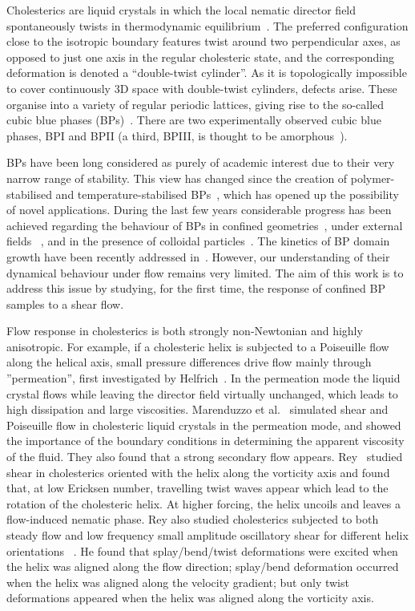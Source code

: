 \documentclass[aps,pre,reprint,superscriptaddress, twocolumn]{revtex4}
\begin{document}
Cholesterics are liquid crystals in which the local nematic director field spontaneously 
twists in thermodynamic equilibrium~\cite{deGennes}. The preferred configuration close 
to the isotropic boundary features twist around two perpendicular axes, as opposed to 
just one axis in the regular cholesteric state, and the corresponding deformation is 
denoted a ``double-twist cylinder''.
As it is topologically impossible to cover continuously 3D space with double-twist 
cylinders, defects arise. These organise into a variety of regular periodic lattices, 
giving rise to the so-called cubic blue phases (BPs)~\cite{Grebel:1984,Wright:1989}. 
There are two experimentally observed cubic blue phases, BPI and BPII (a third, BPIII, 
is thought to be amorphous~\cite{Henrich:2011a}).

BPs have been long considered as purely of academic interest due to their very narrow 
range of stability. This view has changed since the creation of polymer-stabilised and 
temperature-stabilised BPs~\cite{Kikuchi:2002,Coles:2005}, which has opened up the 
possibility of novel applications.
During the last few years considerable progress has been achieved regarding the behaviour 
of BPs in confined geometries~\cite{Fukuda:2010a, Fukuda:2010b, Ravnik:2011b}, under 
external fields ~\cite{Alexander:2008,Fukuda:2009,Henrich:2010a,Castles:2010,Tiribocchi:2011a}, 
and in the presence of colloidal particles~\cite{Ravnik:2011a}.
The kinetics of BP domain growth have been recently addressed in~\cite{Henrich:2010b}. 
However, our understanding of their dynamical behaviour under flow remains
very limited. The aim of this work is to address this issue by studying,
for the first time, the response of confined BP samples to a shear flow.

Flow response in cholesterics is both strongly non-Newtonian and highly anisotropic.
For example, if a cholesteric helix is subjected to a Poiseuille flow along
the helical axis, small pressure differences drive flow mainly through
''permeation'', first investigated by Helfrich~\cite{Helfrich:1969}.
In the permeation mode the liquid crystal flows while leaving the director
field virtually unchanged, which leads to high dissipation and large
viscosities. Marenduzzo et al.~\cite{Marenduzzo:2006a,Marenduzzo:2006b} simulated 
shear and Poiseuille flow in cholesteric liquid crystals in the permeation mode, and 
showed the importance of the boundary conditions in determining the apparent viscosity of the fluid. 
They also found that a strong secondary flow appears.
Rey~\cite{Rey:1996a, Rey:1996b} studied shear in cholesterics oriented with the helix along 
the vorticity axis and found that, at low Ericksen number, travelling twist waves appear which 
lead to the rotation of the cholesteric helix. At higher forcing, the helix uncoils and 
leaves a flow-induced nematic phase.
Rey also studied cholesterics subjected to both steady flow and low frequency
small amplitude oscillatory shear for different helix orientations
~\cite{Rey:2000, Rey:2002}. He found that splay/bend/twist deformations were
excited when the helix was aligned along the flow direction; splay/bend
deformation occurred when the helix was aligned along the velocity gradient;
but only twist deformations
appeared when the helix was aligned along the vorticity axis.
\end{document}
